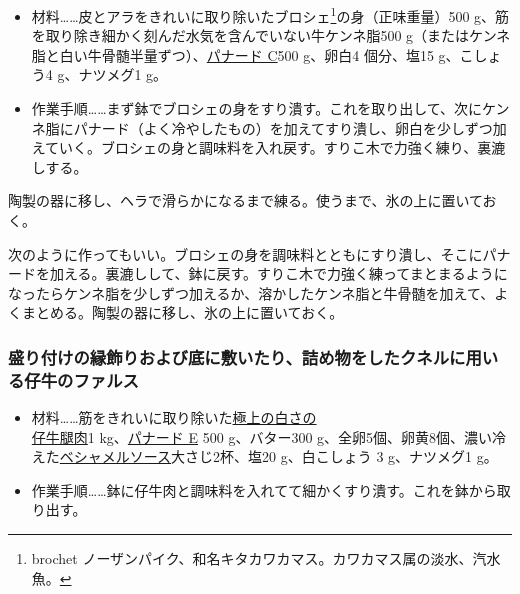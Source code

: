 \begin{recette}


\begin{itemize}
\item
  材料\ldots{}\ldots{}皮とアラをきれいに取り除いたブロシェ\footnote{brochet
    ノーザンパイク、和名キタカワカマス。カワカマス属の淡水、汽水魚。}の身（正味重量）500
  g、筋を取り除き細かく刻んだ水気を含んでいない牛ケンネ脂500
  g（またはケンネ脂と白い牛骨髄半量ずつ）、\protect\hyperlink{panade-c}{パナード
  C}500 g、卵白4 個分、塩15 g、こしょう4 g、ナツメグ1 g。
\item
  作業手順\ldots{}\ldots{}まず鉢でブロシェの身をすり潰す。これを取り出して、次にケンネ脂にパナード（よく冷やしたもの）を加えてすり潰し、卵白を少しずつ加えていく。ブロシェの身と調味料を入れ戻す。すりこ木で力強く練り、裏漉しする。
\end{itemize}

陶製の器に移し、ヘラで滑らかになるまで練る。使うまで、氷の上に置いておく。

次のように作ってもいい。ブロシェの身を調味料とともにすり潰し、そこにパナードを加える。裏漉しして、鉢に戻す。すりこ木で力強く練ってまとまるようになったらケンネ脂を少しずつ加えるか、溶かしたケンネ脂と牛骨髄を加えて、よくまとめる。陶製の器に移し、氷の上に置いておく。

\hypertarget{farce-de-veau-pour-bordures}{%
\subsubsection{盛り付けの縁飾りおよび底に敷いたり、詰め物をしたクネルに用いる仔牛のファルス}\label{farce-de-veau-pour-bordures}}



\begin{itemize}
\item
  材料\ldots{}\ldots{}筋をきれいに取り除いた\ul{極上の白さの\\仔牛腿肉}1
  kg、\protect\hyperlink{panade-e}{パナード E} 500 g、バター300
  g、全卵5個、卵黄8個、濃い冷えた\protect\hyperlink{sauce-bechamel}{ベシャメルソース}大さじ2杯、塩20
  g、白こしょう 3 g、ナツメグ1 g。
\item
  作業手順\ldots{}\ldots{}鉢に仔牛肉と調味料を入れてて細かくすり潰す。これを鉢から取り出す。
\end{itemize}


\end{recette}
